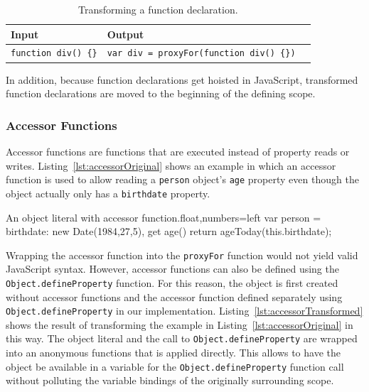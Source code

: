 \begin{table}[h]
\begin{center}
\begin{tabular}{| l | l | l |}
\hline
Input & Output \\ \hline
\lstinline|function div() {}| & \lstinline|var div = proxyFor(function div() {})| \\ \hline
\end{tabular}
\end{center}
\caption[Table caption text]{Transforming a function declaration.}
\label{table:funcTransform}
\end{table}

In addition, because function declarations get hoisted in JavaScript, transformed function declarations are moved to the beginning of the defining scope.


\subsubsection{Accessor Functions}

Accessor functions are functions that are executed instead of property reads or writes.
Listing~\ref{lst:accessorOriginal} shows an example in which an accessor function is used to allow reading a \lstinline{person} object's \lstinline{age} property even though the object actually only has a \lstinline{birthdate} property.

\begin{code}{An object literal with accessor function.}{float,numbers=left}
var person = {
    birthdate: new Date(1984,27,5),
    get age() {
        return ageToday(this.birthdate);
    }
}
\end{code}
\iffalse
\end{verbatim}\fi

Wrapping the accessor function into the \lstinline{proxyFor} function would not yield valid JavaScript syntax.
However, accessor functions can also be defined using the \lstinline{Object.defineProperty} function.
For this reason, the object is first created without accessor functions and the accessor function defined separately using \lstinline{Object.defineProperty} in our implementation.
Listing~\ref{lst:accessorTransformed} shows the result of transforming the example in Listing~\ref{lst:accessorOriginal} in this way.
The object literal and the call to \lstinline{Object.defineProperty} are wrapped into an anonymous functions that is applied directly.
This allows to have the object be available in a variable for the \lstinline{Object.defineProperty} function call without polluting the variable bindings of the originally surrounding scope.

